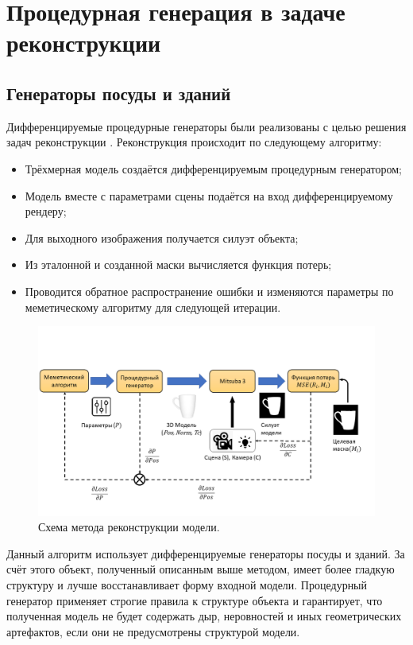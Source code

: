 \documentclass[a4paper,hidelinks,12pt]{article}
\begin{document}
\section{Процедурная генерация в задаче реконструкции}
\subsection{Генераторы посуды и зданий}
Дифференцируемые процедурные генераторы были реализованы с целью решения задач реконструкции \cite{garifullin2023diff} \cite{garifullin2024single}. Реконструкция происходит по следующему алгоритму:
\begin{itemize}
    \item Трёхмерная модель создаётся дифференцируемым процедурным генератором;
    \item Модель вместе с параметрами сцены подаётся на вход дифференцируемому рендеру;
    \item Для выходного изображения получается силуэт объекта;
    \item Из эталонной и созданной маски вычисляется функция потерь;
    \item Проводится обратное распространение ошибки и изменяются параметры по меметическому алгоритму для следующей итерации.
\end{itemize}

\begin{figure}[H]
\begin{center}
	\includegraphics[width=15 cm]{pipeline.png}
	\caption{Схема метода реконструкции модели.}
 	\label{fig_reconstr}
\end{center}
\end{figure}

\par
Данный алгоритм использует дифференцируемые генераторы посуды и зданий. За счёт этого объект, полученный описанным выше методом, имеет более гладкую структуру и лучше восстанавливает форму входной модели. Процедурный генератор применяет строгие правила к структуре объекта и гарантирует, что полученная модель не будет содержать дыр, неровностей и иных геометрических артефактов, если они не предусмотрены структурой модели.
\end{document}
